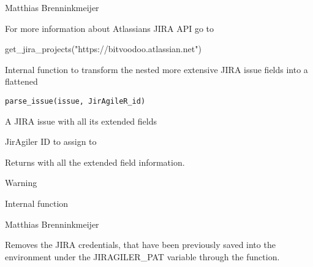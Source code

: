 \documentclass[a4paper]{book}
\begin{document}
%
\begin{Author}\relax
Matthias Brenninkmeijer 
\end{Author}
%
\begin{SeeAlso}\relax
For more information about Atlassians JIRA API go to 
\end{SeeAlso}
%
\begin{Examples}
\begin{ExampleCode}
get_jira_projects("https://bitvoodoo.atlassian.net")
\end{ExampleCode}
\end{Examples}
%
\begin{Description}\relax
Internal function to transform the nested more extensive JIRA issue fields into a flattened 
\end{Description}
%
\begin{Usage}
\begin{verbatim}
parse_issue(issue, JirAgileR_id)
\end{verbatim}
\end{Usage}
%
\begin{Arguments}
\begin{ldescription}
\item[\code{issue}] A JIRA issue with all its extended fields

\item[\code{JirAgileR\_id}] JirAgiler ID to assign to
\end{ldescription}
\end{Arguments}
%
\begin{Value}
Returns  with all the extended field information.
\end{Value}
%
\begin{Section}{Warning}

Internal function
\end{Section}
%
\begin{Author}\relax
Matthias Brenninkmeijer 
\end{Author}
%
\begin{Description}\relax
Removes the JIRA credentials, that have been previously saved into the environment under the JIRAGILER\_PAT variable through the  function.
\end{Description}
\end{document}
